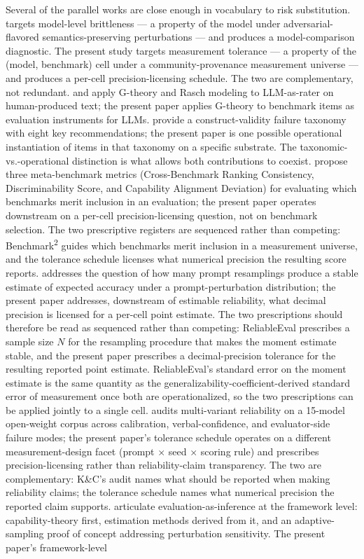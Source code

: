 \documentclass[11pt]{article}
\begin{document}
Several of the parallel works are close enough in vocabulary to risk substitution. \citet{romanou2026brittlebench} targets model-level brittleness --- a property of the model under adversarial-flavored semantics-preserving perturbations --- and produces a model-comparison diagnostic. The present study targets measurement tolerance --- a property of the (model, benchmark) cell under a community-provenance measurement universe --- and produces a per-cell precision-licensing schedule. The two are complementary, not redundant. \citet{sui2025evaluating} and \citet{camuffo2026variance} apply G-theory and Rasch modeling to LLM-as-rater on human-produced text; the present paper applies G-theory to benchmark items as evaluation instruments for LLMs. \citet{bean2025measuring} provide a construct-validity failure taxonomy with eight key recommendations; the present paper is one possible operational instantiation of items in that taxonomy on a specific substrate. The taxonomic-vs.-operational distinction is what allows both contributions to coexist. \citet{qian2026benchmarksquared} propose three meta-benchmark metrics (Cross-Benchmark Ranking Consistency, Discriminability Score, and Capability Alignment Deviation) for evaluating which benchmarks merit inclusion in an evaluation; the present paper operates downstream on a per-cell precision-licensing question, not on benchmark selection. The two prescriptive registers are sequenced rather than competing: Benchmark\textsuperscript{2} guides which benchmarks merit inclusion in a measurement universe, and the tolerance schedule licenses what numerical precision the resulting score reports. \citet{lior2025reliableeval} addresses the question of how many prompt resamplings produce a stable estimate of expected accuracy under a prompt-perturbation distribution; the present paper addresses, downstream of estimable reliability, what decimal precision is licensed for a per-cell point estimate. The two prescriptions should therefore be read as sequenced rather than competing: ReliableEval prescribes a sample size $N$ for the resampling procedure that makes the moment estimate stable, and the present paper prescribes a decimal-precision tolerance for the resulting reported point estimate. ReliableEval's standard error on the moment estimate is the same quantity as the generalizability-coefficient-derived standard error of measurement once both are operationalized, so the two prescriptions can be applied jointly to a single cell. \citet{karmakar2026singleprompt} audits multi-variant reliability on a 15-model open-weight corpus across calibration, verbal-confidence, and evaluator-side failure modes; the present paper's tolerance schedule operates on a different measurement-design facet (prompt $\times$ seed $\times$ scoring rule) and prescribes precision-licensing rather than reliability-claim transparency. The two are complementary: K\&C's audit names what should be reported when making reliability claims; the tolerance schedule names what numerical precision the reported claim supports. \citet{jo2025evalinference} articulate evaluation-as-inference at the framework level: capability-theory first, estimation methods derived from it, and an adaptive-sampling proof of concept addressing perturbation sensitivity. The present paper's framework-level 
\end{document}
